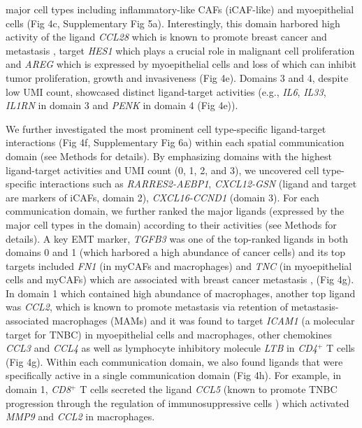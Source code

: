 major cell types including inflammatory-like CAFs (iCAF-like) and myoepithelial cells (Fig 4c, Supplementary Fig 5a). Interestingly, this domain harbored high activity of the ligand \textit{CCL28} which is known to promote breast cancer and metastasis \citep{Yang2017}, target \textit{HES1} which plays a crucial role in malignant cell proliferation \citep{Li2018} and \textit{AREG} which is expressed by myoepithelial cells and loss of which can inhibit tumor proliferation, growth and invasiveness \citep{Mao2018} (Fig 4e). Domains 3 and 4, despite low UMI count, showcased distinct ligand-target activities (e.g., \textit{IL6}, \textit{IL33}, \textit{IL1RN} in domain 3 and \textit{PENK} in domain 4 (Fig 4e)).\par 

We further investigated the most prominent cell type-specific ligand-target interactions (Fig 4f, Supplementary Fig 6a) within each spatial communication domain (see Methods for details). By emphasizing domains with the highest ligand-target activities and UMI count (0, 1, 2, and 3), we uncovered cell type-specific interactions such as \textit{RARRES2-AEBP1}, \textit{CXCL12-GSN} (ligand and target are markers of iCAFs, domain 2), \textit{CXCL16-CCND1} (domain 3). For each communication domain, we further ranked the major ligands (expressed by the major cell types in the domain) according to their activities (see Methods for details). A key EMT marker, \textit{TGFB3} \citep{jcm5070063} was one of the top-ranked ligands in both domains 0 and 1 (which harbored a high abundance of cancer cells) and its top targets included \textit{FN1} (in myCAFs and macrophages) and \textit{TNC} (in myoepithelial cells and myCAFs) which are associated with breast cancer metastasis \citep{Wang2018,Oskarsson2011}, (Fig 4g). In domain 1 which contained high abundance of macrophages, another top ligand was \textit{CCL2}, which is known to promote metastasis via retention of metastasis-associated macrophages (MAMs) \citep{10.1084/jem.20141836} and it was found to target \textit{ICAM1} (a molecular target for TNBC) \citep{doi:10.1073/pnas.1408556111} in myoepithelial cells and macrophages, other chemokines \textit{CCL3} and \textit{CCL4} as well as lymphocyte inhibitory molecule \textit{LTB} in \textit{CD4}$^{+}$ T cells (Fig 4g). Within each communication domain, we also found ligands that were specifically active in a single communication domain (Fig 4h). For example, in domain 1, \textit{CD8}$^{+}$ T cells secreted the ligand \textit{CCL5} (known to promote TNBC progression through the regulation of immunosuppressive cells \citep{Zhang2013}) which activated \textit{MMP9} and \textit{CCL2} in macrophages. \par

